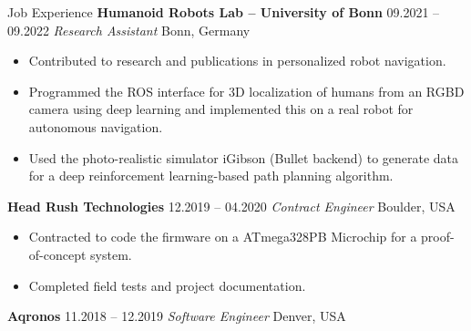 \begin{rubric}{Job Experience}
%
%
\entry*[] \textbf{Humanoid Robots Lab -- University of Bonn} \hfill 09.2021 -- 09.2022 \newline
 \textit{Research Assistant} \hfill Bonn, Germany \newline 
\vspace{\CVItemizeHeaderSpacing} \begin{itemize}[leftmargin=*, rightmargin=1cm]
	\setlength{\itemsep}{\CVItemizeSpacing}
	\item Contributed to research and publications in personalized robot navigation.
	\item Programmed the ROS interface for 3D localization of humans from an RGBD camera using deep learning and implemented this on a real robot for autonomous navigation.
	\item Used the photo-realistic simulator iGibson (Bullet backend) to generate data for a deep reinforcement learning-based path planning algorithm. 
\end{itemize}
%
%
\entry*[] \textbf{Head Rush Technologies} \hfill 12.2019 -- 04.2020 \newline
 \textit{Contract Engineer} \hfill Boulder, USA \newline 
\vspace{\CVItemizeHeaderSpacing} \begin{itemize}[leftmargin=*, rightmargin=1cm]
	\setlength{\itemsep}{\CVItemizeSpacing}
	\item Contracted to code the firmware on a ATmega328PB Microchip for a proof-of-concept system.  
	\item Completed field tests and project documentation.  
\end{itemize}
%
\entry*[] \textbf{Aqronos} \hfill 11.2018 -- 12.2019 \newline
\textit{Software Engineer} \hfill Denver, USA \newline
\vspace{\CVItemizeHeaderSpacing} \begin{itemize}[leftmargin=*, rightmargin=1cm]
	\setlength{\itemsep}{\CVItemizeSpacing}

\end{itemize}
\end{rubric}
